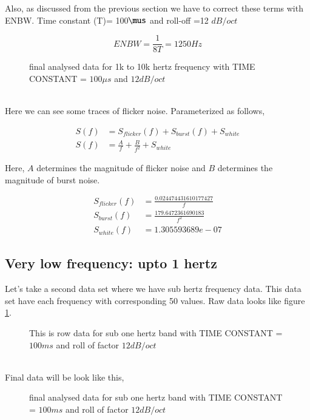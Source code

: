 Also, as discussed from the previous section we have to correct these terms with ENBW. Time constant (T)= 100$\mus$ and roll-off =12 $dB/oct$
       
\[
ENBW = \frac{1}{8T} = 1250 Hz 
\]



\begin{figure}[hbt!]
\caption{final analysed data for 1k to 10k hertz frequency with TIME CONSTANT = $100\mu s$ and $12dB/oct$}
\end{figure}\\
 
Here we can see some traces of flicker noise. Parameterized as follows,


\begin{align*}
S(f) & = S_{flicker}(f)+ S_{burst}(f) + S_{white}\\
S(f) & = \frac{A}{f}+\frac{B}{f^2}+ S_{white}
\end{align*}

Here, $A$ determines the magnitude of flicker noise and $B$ determines the magnitude of burst noise.

\begin{align}\label{eq1}
S_{flicker}(f) & = \frac{0.024474431610177427}{f}\\
S_{burst}(f) & = \frac{179.6472361690183}{f^2}\\  
S_{white}(f) & = 1.305593689e-07
\end{align}


\subsection{Very low frequency: upto 1 hertz}

Let's take a second data set where we have sub hertz frequency data. This data set have each frequency with corresponding 50 values. Raw data looks like figure \ref{rawsubhz}.


\begin{figure}[hbt!]
\caption{This is row data for sub one hertz band with TIME CONSTANT = $100ms$ and roll of factor $12dB/oct$} 
\label{rawsubhz}
\end{figure}\\


Final data will be look like this,

\begin{figure}[hbt!]
\caption{final analysed data for sub one hertz band with TIME CONSTANT = $100ms$ and roll of factor $12dB/oct$}
\end{figure}\\


